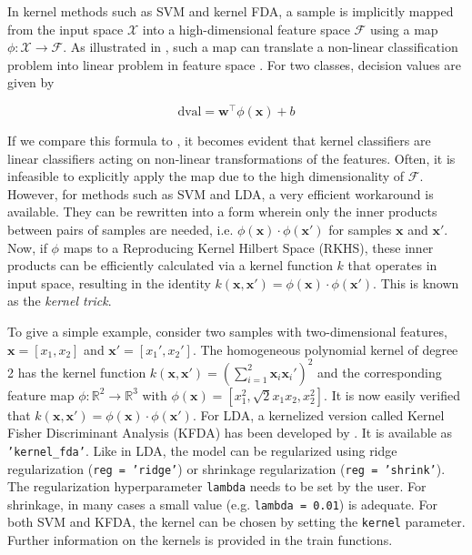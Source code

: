 \documentclass[utf8]{frontiersSCNS} %
\newcommand{\w}{\mathbf{w}}
\newcommand{\x}{\mathbf{x}}
\newcommand{\R}{\mathbb{R}}
\newcommand{\ttt}[1]{\texttt{#1}}
\begin{document}
In kernel methods such as SVM and kernel FDA, a sample is implicitly mapped from the input space $\mathcal{X}$ into a high-dimensional feature space $\mathcal{F}$ using a map $\phi:\mathcal{X}\rightarrow\mathcal{F}$. As illustrated in , such a map can translate a non-linear classification problem into linear problem in feature space \citep{Scholkopf2001LearningBeyond}. For two classes, decision values are given by

\begin{equation}
\label{eq:kernel_dval}
\text{dval} = \w^\top\phi(\x) + b
\end{equation}

If we compare this formula to , it becomes evident that kernel classifiers are linear classifiers acting on non-linear transformations of the features. Often, it is  infeasible to explicitly apply the map due to the high dimensionality of $\mathcal{F}$.  However, for methods such as SVM and LDA, a very efficient workaround is available. They can be rewritten into a form wherein only the inner products between pairs of samples are needed, i.e. $\phi(\x)\cdot\phi(\x')$ for samples $\x$ and $\x'$. Now, if $\phi$ maps to a Reproducing Kernel Hilbert Space (RKHS), these inner products can be efficiently calculated via a kernel function $k$ that operates in input space, resulting in the identity $k(\x,\x') = \phi(\x)\cdot\phi(\x')$. This is known as the \textit{kernel trick}.

To give a simple example, consider two samples with  two-dimensional features, $\x = [x_1, x_2]$ and $\x' = [x_1', x_2']$. The homogeneous polynomial kernel of degree 2 has the kernel function $k(\x,\x') = (\sum_{i=1}^2 \x_i\x_i')^2$ and the corresponding feature map $\phi:\R^2\rightarrow\R^3$ with $\phi(\x)= [x_1^2, \sqrt{2}x_1 x_2, x_2^2]$. It is now easily verified that $k(\x,\x') = \phi(\x)\cdot\phi(\x')$. For LDA, a kernelized version called Kernel Fisher Discriminant Analysis (KFDA) has been developed by \cite{Mika1999FisherKernels}. It is available as \ttt{'kernel\_fda'}. Like in LDA, the model can be regularized using ridge regularization (\ttt{reg = 'ridge'}) or shrinkage regularization (\ttt{reg = 'shrink'}). The regularization hyperparameter \ttt{lambda} needs to be set by the user. For shrinkage, in many cases a small value (e.g. \ttt{lambda = 0.01}) is adequate. For both SVM and KFDA, the kernel can be chosen by setting the \ttt{kernel} parameter. Further information on the kernels is provided in the train functions.
\end{document}
